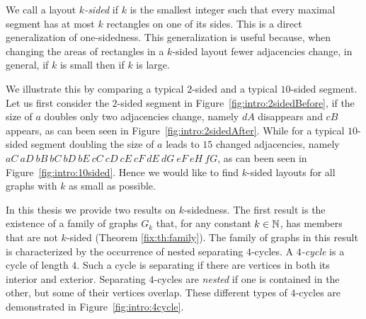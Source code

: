   We call a layout \emph{$k$-sided} if $k$ is the smallest integer such that every maximal segment has at most $k$ rectangles on one of its sides. This is a direct generalization of one-sidedness.
  This generalization is useful because, when changing the areas of rectangles in a $k$-sided layout fewer adjacencies change, in general, if $k$ is small then if $k$ is large.

  We illustrate this by comparing a typical $2$-sided and a typical $10$-sided segment.
  Let us first consider the $2$-sided segment in Figure~\ref{fig:intro:2sidedBefore}, if the size of $a$ doubles only two adjacencies change, namely $dA$ disappears and $cB$ appears, as can been seen in Figure~\ref{fig:intro:2sidedAfter}.
  While for a typical $10$-sided segment doubling the size of $a$ leads to $15$ changed adjacencies, namely $aC\ aD\ bB\ bC\ bD\ bE\ cC\ cD\ cE\ cF\ dE\ dG\ eF\ eH\ fG$, as can been seen in Figure~\ref{fig:intro:10sided}.
  Hence we would like to find $k$-sided layouts for all graphs with $k$ as small as possible.


  In this thesis we provide two results on $k$-sidedness. The first result is the existence of a family of graphs $G_k$ that, for any constant $k \in \mathbb{N}$, has members that are not $k$-sided (Theorem \ref{fix:th:family}). The family of graphs in this result is characterized by the occurrence of nested separating $4$-cycles.
  A \emph{$4$-cycle} is a cycle of length $4$.
  Such a cycle is separating if there are vertices in both its interior and exterior.
  Separating $4$-cycles are \emph{nested} if one is contained in the other, but some of their vertices overlap. These different types of $4$-cycles are demonstrated in Figure~\ref{fig:intro:4cycle}.

